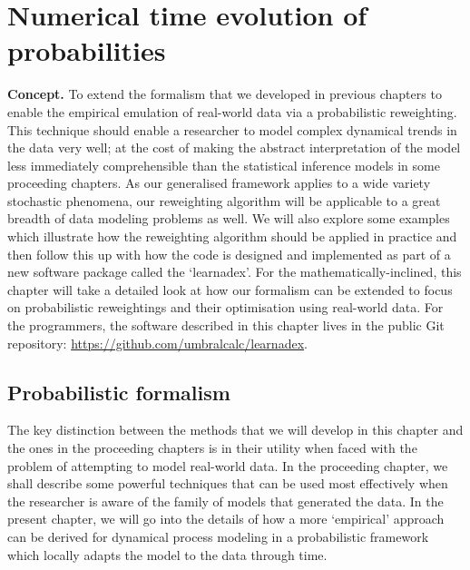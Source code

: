 \chapter{\sffamily Numerical time evolution of probabilities}

{\bfseries\sffamily Concept.} To extend the formalism that we developed in previous chapters to enable the empirical emulation of real-world data via a probabilistic reweighting. This technique should enable a researcher to model complex dynamical trends in the data very well; at the cost of making the abstract interpretation of the model less immediately comprehensible than the statistical inference models in some proceeding chapters. As our generalised framework applies to a wide variety stochastic phenomena, our reweighting algorithm will be applicable to a great breadth of data modeling problems as well. We will also explore some examples which illustrate how the reweighting algorithm should be applied in practice and then follow this up with how the code is designed and implemented as part of a new software package called the `learnadex'. For the mathematically-inclined, this chapter will take a detailed look at how our formalism can be extended to focus on probabilistic reweightings and their optimisation using real-world data. For the programmers, the software described in this chapter lives in the public Git repository: \href{https://github.com/umbralcalc/learnadex}{https://github.com/umbralcalc/learnadex}.

\section{\sffamily Probabilistic formalism}

The key distinction between the methods that we will develop in this chapter and the ones in the proceeding chapters is in their utility when faced with the problem of attempting to model real-world data. In the proceeding chapter, we shall describe some powerful techniques that can be used most effectively when the researcher is aware of the family of models that generated the data. In the present chapter, we will go into the details of how a more `empirical' approach can be derived for dynamical process modeling in a probabilistic framework which locally adapts the model to the data through time. 

